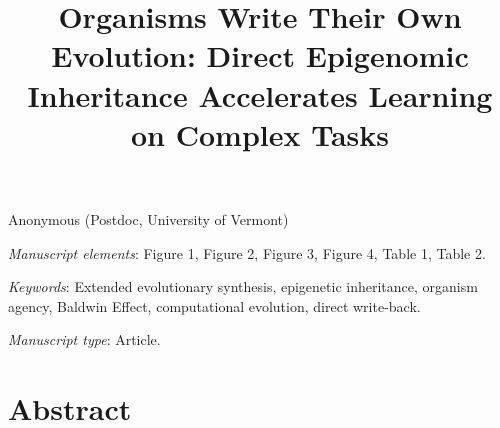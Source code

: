 \documentclass[11pt]{article}
\title{Organisms Write Their Own Evolution: Direct Epigenomic Inheritance Accelerates Learning on Complex Tasks}
\date{}
\begin{document}
\maketitle

\noindent{} Anonymous (Postdoc, University of Vermont)

\bigskip

\textit{Manuscript elements}: Figure 1, Figure 2, Figure 3, Figure 4, Table 1, Table 2.

\bigskip

\textit{Keywords}: Extended evolutionary synthesis, epigenetic inheritance, organism agency, Baldwin Effect, computational evolution, direct write-back.

\bigskip

\textit{Manuscript type}: Article.

\bigskip


\linenumbers{}
\modulolinenumbers[1]

\newpage{}

\section*{Abstract}
\end{document}
